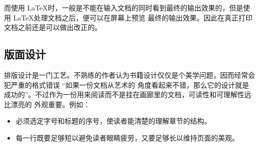 
而使用 \LaTeX 时，一般是不能在输入文档的同时看到最终的输出效果的，但是使用 \LaTeX 处理文档之后，便可以在屏幕上预览
最终的输出效果。因此在真正打印文档之前还是可以做出改正的。

\subsection{版面设计}


排版设计是一门工艺。不熟练的作者认为书籍设计仅仅是个美学问题，因而经常会犯严重的格式错误 \pozhehao “如果一份文档从艺术的
角度看起来不错，那么它的设计就是成功的”。不过作为一份用来阅读而不是挂在画廊里的文档，可读性和可理解性远比漂亮的
外观重要。例如：
\begin{itemize}
\item 必须选定字号和标题的序号，使读者能清楚的理解章节的结构。
\item
每一行既要足够短以避免读者眼睛疲劳，又要足够长以维持页面的美观。
\end{itemize}


